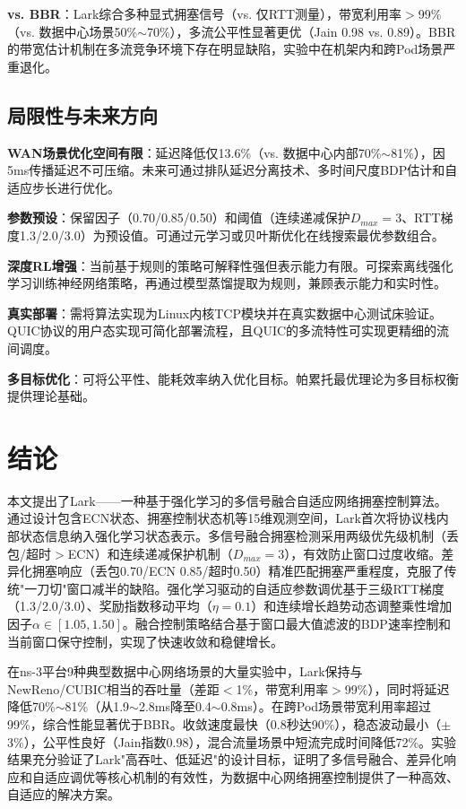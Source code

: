\documentclass[10pt,twocolumn]{article}
\begin{document}
\textbf{vs. BBR\cite{bbr}}：Lark综合多种显式拥塞信号（vs. 仅RTT测量），带宽利用率$>$99\%（vs. 数据中心场景50\%$\sim$70\%），多流公平性显著更优（Jain 0.98 vs. 0.89）。BBR的带宽估计机制在多流竞争环境下存在明显缺陷，实验中在机架内和跨Pod场景严重退化。

\subsection{局限性与未来方向}

\textbf{WAN场景优化空间有限}：延迟降低仅13.6\%（vs. 数据中心内部70\%$\sim$81\%），因5ms传播延迟不可压缩。未来可通过排队延迟分离技术、多时间尺度BDP估计和自适应步长进行优化。

\textbf{参数预设}：保留因子（0.70/0.85/0.50）和阈值（连续递减保护$D_{max}=3$、RTT梯度1.3/2.0/3.0）为预设值。可通过元学习\cite{meta_learning}或贝叶斯优化在线搜索最优参数组合。

\textbf{深度RL增强}：当前基于规则的策略可解释性强但表示能力有限。可探索离线强化学习训练神经网络策略，再通过模型蒸馏提取为规则，兼顾表示能力和实时性。

\textbf{真实部署}：需将算法实现为Linux内核TCP模块并在真实数据中心测试床验证。QUIC协议的用户态实现可简化部署流程，且QUIC的多流特性可实现更精细的流间调度。

\textbf{多目标优化}：可将公平性、能耗效率纳入优化目标。帕累托最优理论为多目标权衡提供理论基础\cite{fairness}。


\section{结论}

本文提出了Lark——一种基于强化学习的多信号融合自适应网络拥塞控制算法。通过设计包含ECN状态、拥塞控制状态机等15维观测空间，Lark首次将协议栈内部状态信息纳入强化学习状态表示。多信号融合拥塞检测采用两级优先级机制（丢包/超时$>$ECN）和连续递减保护机制（$D_{max}=3$），有效防止窗口过度收缩。差异化拥塞响应（丢包0.70/ECN 0.85/超时0.50）精准匹配拥塞严重程度，克服了传统"一刀切"窗口减半的缺陷。强化学习驱动的自适应参数调优基于三级RTT梯度（1.3/2.0/3.0）、奖励指数移动平均（$\eta=0.1$）和连续增长趋势动态调整乘性增加因子$\alpha \in [1.05, 1.50]$。融合控制策略结合基于窗口最大值滤波的BDP速率控制和当前窗口保守控制，实现了快速收敛和稳健增长。

在ns-3平台9种典型数据中心网络场景的大量实验中，Lark保持与NewReno/CUBIC相当的吞吐量（差距$<$1\%，带宽利用率$>$99\%），同时将延迟降低70\%$\sim$81\%（从1.9$\sim$2.8ms降至0.4$\sim$0.8ms）。在跨Pod场景带宽利用率超过99\%，综合性能显著优于BBR。收敛速度最快（0.8秒达90\%），稳态波动最小（$\pm$3\%），公平性良好（Jain指数0.98），混合流量场景中短流完成时间降低72\%。实验结果充分验证了Lark"高吞吐、低延迟"的设计目标，证明了多信号融合、差异化响应和自适应调优等核心机制的有效性，为数据中心网络拥塞控制提供了一种高效、自适应的解决方案。
\end{document}
